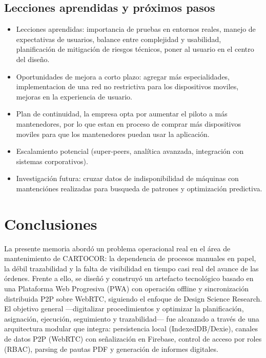 \documentclass[10pt,a4paper]{report}
\begin{document}
\section*{Lecciones aprendidas y pr\'oximos pasos}
\begin{itemize}
    \item Lecciones aprendidas: importancia de pruebas en entornos reales, manejo de expectativas de usuarios, balance entre complejidad y usabilidad, planificaci\'on de mitigaci\'on de riesgos t\'ecnicos, poner al usuario en el centro del dise\~no.
    \item Oportunidades de mejora a corto plazo: agregar más especialidades, implementacion de una red no restrictiva para los dispositivos moviles, mejoras en la experiencia de usuario.
    \item Plan de continuidad, la empresa opta por aumentar el piloto a más mantenedores, por lo que estan en proceso de comprar más dispositivos moviles para que los mantenedores puedan usar la aplicación.
    \item Escalamiento potencial (super-peers, anal\'itica avanzada, integraci\'on con sistemas corporativos).
    \item Investigaci\'on futura: cruzar datos de indisponibilidad de m\'aquinas con mantenciónes realizadas para busqueda de patrones y optimizaci\'on predictiva.
\end{itemize}
\chapter*{Conclusiones}

La presente memoria abordó un problema operacional real en el área de mantenimiento de CARTOCOR: la dependencia de procesos manuales en papel, la débil trazabilidad y la falta de visibilidad en tiempo casi real del avance de las órdenes. Frente a ello, se diseñó y construyó un artefacto tecnológico basado en una Plataforma Web Progresiva (PWA) con operación offline y sincronización distribuida P2P sobre WebRTC, siguiendo el enfoque de Design Science Research. El objetivo general —digitalizar procedimientos y optimizar la planificación, asignación, ejecución, seguimiento y trazabilidad— fue alcanzado a través de una arquitectura modular que integra: persistencia local (IndexedDB/Dexie), canales de datos P2P (WebRTC) con señalización en Firebase, control de acceso por roles (RBAC), parsing de pautas PDF y generación de informes digitales.
\end{document}
